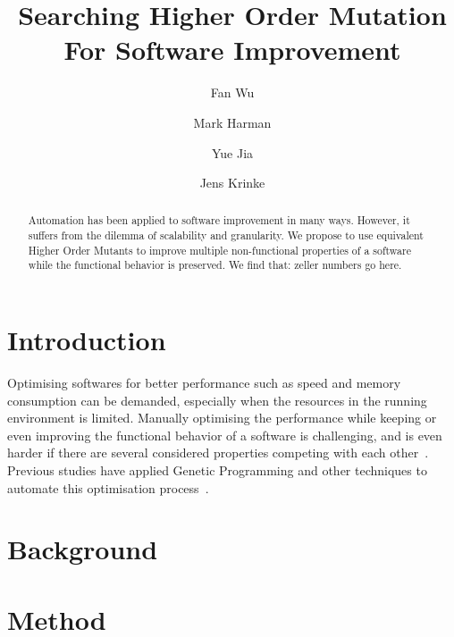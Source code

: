\documentclass[oribibl]{llncs}
\begin{document}
\title{Searching Higher Order Mutation For Software Improvement}

\author{Fan Wu         \and
		Mark Harman        \and
		Yue Jia         \and
		Jens Krinke
}



\maketitle

\begin{abstract}
Automation has been applied to software improvement in many ways.
However, it suffers from the dilemma of scalability and granularity.
We propose to use equivalent Higher Order Mutants to improve multiple non-functional properties of a software while the functional behavior is preserved.
We find that: zeller numbers go here.
\end{abstract}

\section{Introduction}
\label{sec_intro}

Optimising softwares for better performance such as speed and memory consumption can be demanded, especially when the resources in the running environment is limited.
Manually optimising the performance while keeping or even improving the functional behavior of a software is challenging, 
and is even harder if there are several considered properties competing with each other~\cite{Harman:2012:GCC:2351676.2351678}.
Previous studies have applied Genetic Programming and other techniques to automate this optimisation process~\cite{6035728, geneticimprovementJP, Wu:2015:DPO:2739480.2754648}.


\section{Background}
\label{sec_back}

\section{Method}
\label{sec_method}
\end{document}
